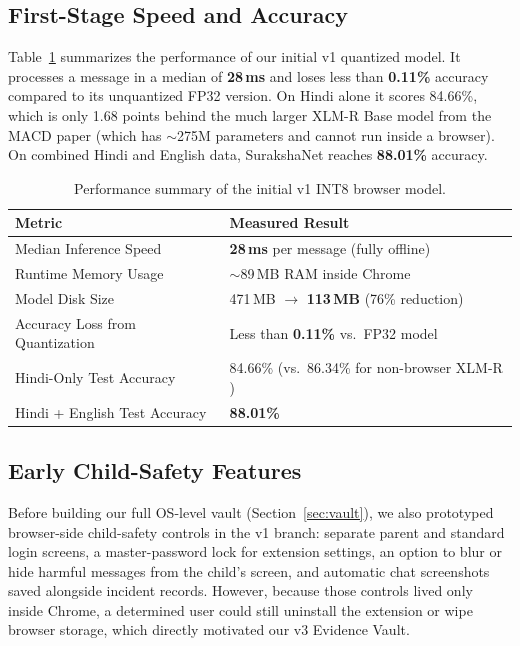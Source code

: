\documentclass[11pt,a4paper]{article}
\begin{document}
\subsection{First-Stage Speed and Accuracy}
Table~\ref{tab:quant_summary} summarizes the performance of our initial v1 quantized model. It processes a message in a median of \textbf{28\,ms} and loses less than \textbf{0.11\%} accuracy compared to its unquantized FP32 version. On Hindi alone it scores 84.66\%, which is only 1.68 points behind the much larger XLM-R Base model from the MACD paper (which has $\sim$275M parameters and cannot run inside a browser). On combined Hindi and English data, SurakshaNet reaches \textbf{88.01\%} accuracy.

\begin{table}[H]
\centering
\caption{Performance summary of the initial v1 INT8 browser model.}
\label{tab:quant_summary}
\small
\begin{tabularx}{0.92\textwidth}{l X}
\toprule
\textbf{Metric} & \textbf{Measured Result} \\
\midrule
Median Inference Speed & \textbf{28\,ms} per message (fully offline) \\
Runtime Memory Usage & $\sim$89\,MB RAM inside Chrome \\
Model Disk Size & 471\,MB $\rightarrow$ \textbf{113\,MB} (76\% reduction) \\
Accuracy Loss from Quantization & Less than \textbf{0.11\%} vs.\ FP32 model \\
Hindi-Only Test Accuracy & 84.66\% (vs.\ 86.34\% for non-browser XLM-R \cite{NEURIPS2022_a7c4163b}) \\
Hindi + English Test Accuracy & \textbf{88.01\%} \\
\bottomrule
\end{tabularx}
\end{table}

\subsection{Early Child-Safety Features}
Before building our full OS-level vault (Section~\ref{sec:vault}), we also prototyped browser-side child-safety controls in the v1 branch: separate parent and standard login screens, a master-password lock for extension settings, an option to blur or hide harmful messages from the child's screen, and automatic chat screenshots saved alongside incident records. However, because those controls lived only inside Chrome, a determined user could still uninstall the extension or wipe browser storage, which directly motivated our v3 Evidence Vault.
\end{document}
